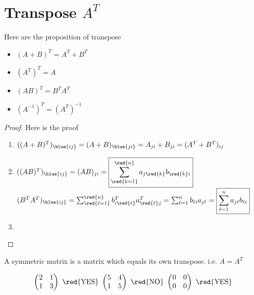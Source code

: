 
\section{Transpose $A^{T}$}

\begin{proposition}
    Here are the proposition of transpose
    \begin{itemize}
        \item \( (A+B)^T = A^T + B^T \)
        \item \( (A^T)^T = A \)
        \item \( (AB)^T = B^T A^T \)
        \item \( (A^{-1})^T =  (A^T)^{-1}\)
    \end{itemize}
\end{proposition}
\begin{proof}
    Here is the proof
    \begin{enumerate}[label=$\arabic*^\circ$]
        \item $ ((A+B)^T)_{\blue{ij}} = (A+B)_{\blue{ji}} = A_{ji} + B_{ji} = (A^T + B^T)_{ij}$
        \item $ ((AB)^T)_{\blue{ij}} = (AB)_{ji} = \boxed{\sum_{\red{k=1}}^{\red{n}} a_{j\red{k}}b_{\red{k}i}}$ \quad
              $ (B^T A^T)_{\blue{ij}} = \sum_{\red{\ell=1}}^{\red{n}} b^T_{i\red{\ell}}a^T_{\red{\ell}j} = \sum_{\ell=1}^{n} b_{\ell i}a_{j \ell} = \boxed{\sum_{\ell=1}^{n} a_{j\ell}b_{\ell i}}$
        \item 
    \end{enumerate}
\end{proof}

\newpage

\begin{definition}
    A symmetric matrix is a matrix which equals its own transpose. i.e. $A=A^T$
    \begin{eg}
    \[
    \begin{pmatrix}
        2 & 1\\
        1 & 3
    \end{pmatrix} \ \red{\text{YES}} \ \begin{pmatrix}
        5 & 4\\
        1 & 5
    \end{pmatrix} \ \red{\text{NO}} \ \begin{pmatrix}
        0 & 0\\
        0 & 0
    \end{pmatrix} \ \red{\text{YES}}
    \]
    \end{eg}
\end{definition}

